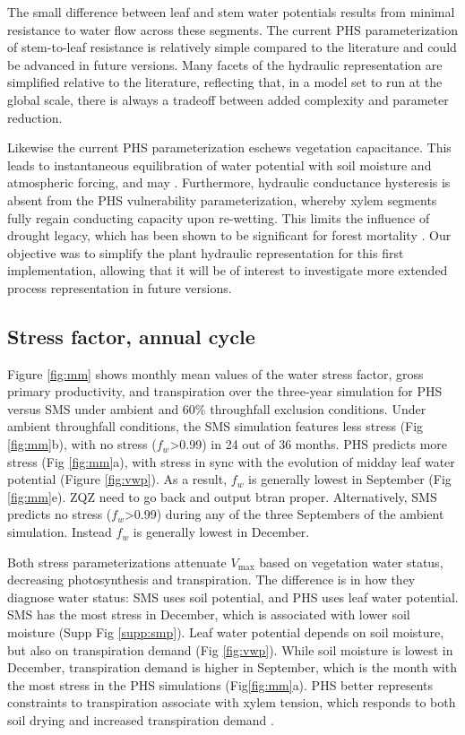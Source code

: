 \documentclass[draft,linenumbers]{agujournal}
\begin{document}
The small difference between leaf and stem water potentials results from minimal resistance to water flow across these segments. 
The current PHS parameterization of stem-to-leaf resistance is relatively simple compared to the literature \citep{franks2007} and could be advanced in future versions. 
Many facets of the hydraulic representation are simplified relative to the literature, reflecting that, in a model set to run at the global scale, 
there is always a tradeoff between added complexity and parameter reduction.

Likewise the current PHS parameterization eschews vegetation capacitance. 
This leads to instantaneous equilibration of water potential with soil moisture and atmospheric forcing, and may .
Furthermore, hydraulic conductance hysteresis is absent from the PHS vulnerability parameterization, 
whereby xylem segments fully regain conducting capacity upon re-wetting.
This limits the influence of drought legacy, which has been shown to be significant for forest mortality \citep{anderegg2013}.
Our objective was to simplify the plant hydraulic representation for this first implementation, 
allowing that it will be of interest to investigate more extended process representation in future versions.

\subsection{Stress factor, annual cycle}

Figure \ref{fig:mm} shows monthly mean values of the water stress factor, gross primary productivity, and transpiration
over the three-year simulation for PHS versus SMS under ambient and 60\% throughfall exclusion conditions.
Under ambient throughfall conditions, the SMS simulation features less stress (Fig \ref{fig:mm}b), with
no stress ($f_w$>0.99) in 24 out of 36 months.
PHS predicts more stress (Fig \ref{fig:mm}a), with stress in sync with the evolution of midday leaf water potential (Figure \ref{fig:vwp}).
As a result, $f_w$ is generally lowest in September (Fig \ref{fig:mm}e). ZQZ need to go back and output btran proper.
Alternatively, SMS predicts no stress ($f_w$>0.99) during any of the three Septembers of the ambient simulation.
Instead $f_w$ is generally lowest in December.

Both stress parameterizations attenuate $V_{\text{max}}$ based on vegetation water status, decreasing photosynthesis and transpiration.
The difference is in how they diagnose water status: SMS uses soil potential, and PHS uses leaf water potential.
SMS has the most stress in December, which is associated with lower soil moisture (Supp Fig \ref{supp:smp}).
Leaf water potential depends on soil moisture, but also on transpiration demand (Fig \ref{fig:vwp}).
While soil moisture is lowest in December, transpiration demand is higher in September,
which is the month with the most stress in the PHS simulations (Fig\ref{fig:mm}a).
PHS better represents constraints to transpiration associate with xylem tension, which responds to both soil drying and increased transpiration demand \citep{sperry2015}.
\end{document}
